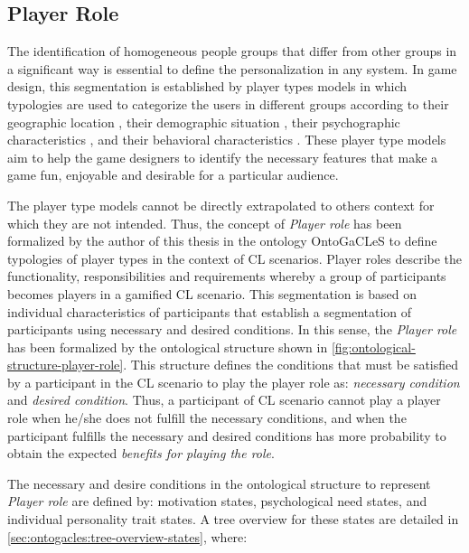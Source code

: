 \subsection{Player Role}
\label{subsec:player-role}

The identification of homogeneous people groups that differ from other groups in a significant way is essential to define the personalization in any system. In game design, this segmentation is established by player types models in which typologies are used to categorize the users in different groups according to their geographic location \cite{BenJuddChrisAvelloneHideoKojimaKeijiInafune2016, ChakrabortyNorcioVeerAndreMillerRegelsberger2015}, their demographic situation \cite{GreenbergSherryLachlanLucasHolmstrom2010, Shaw2012}, their psychographic characteristics \cite{Tseng2011, Yee2006}, and their behavioral characteristics \cite{Bartle2004, Lazzaro2009}. These player type models aim to help the game designers to identify the necessary features that make a game fun, enjoyable and desirable for a particular audience.

The player type models cannot be directly extrapolated to others context for which they are not intended. Thus, the concept of \emph{Player role} has been formalized by the author of this thesis in the ontology OntoGaCLeS to define typologies of player types in the context of CL scenarios. Player roles describe the functionality, responsibilities and requirements whereby a group of participants becomes players in a gamified CL scenario. This segmentation is based on individual characteristics of participants that establish a segmentation of participants using necessary and desired conditions. In this sense, the \emph{Player role} has been formalized by the ontological structure shown in \autoref{fig:ontological-structure-player-role}. This structure defines the conditions that must be satisfied by a participant in the CL scenario to play the player role as: \emph{necessary condition} and \emph{desired condition}. Thus, a participant of CL scenario cannot play a player role when he/she does not fulfill the necessary conditions, and when the participant fulfills the necessary and desired conditions has more probability to obtain the expected \emph{benefits for playing the role}.

The necessary and desire conditions in the ontological structure to represent \emph{Player role} are defined by: motivation states, psychological need states, and individual personality trait states. A tree overview for these states are detailed in \autoref{sec:ontogacles:tree-overview-states}, where:

